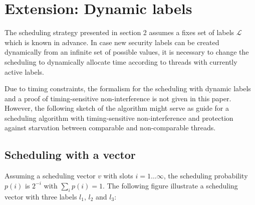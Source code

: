 \documentclass[10pt,preprint]{sigplanconf}
\begin{document}


\section{Extension: Dynamic labels}

The scheduling strategy presented in section 2 assumes a fixes set of labels $\mathcal{L}$ which is known in advance.  In case new security labels can be created dynamically from an infinite set of possible values, it is necessary to change the scheduling to dynamically allocate time according to threads with currently active labels.

Due to timing constraints, the formalism for the scheduling with dynamic labels and a proof of timing-sensitive non-interference is not given in this paper.  However, the following sketch of the algorithm might serve as guide for a scheduling algorithm with timing-sensitive non-interference and protection against starvation between comparable and non-comparable threads.

\subsection{Scheduling with a vector}

Assuming a scheduling vector $v$ with slots $i=1 \ldots \infty$, the scheduling probability $p(i)$ is $2^{-i}$ with $\sum_i p(i) = 1$.  The following figure illustrate a scheduling vector with three labels $l_1$, $l_2$ and $l_3$: \\[1ex]

 \\[1ex]
\end{document}
